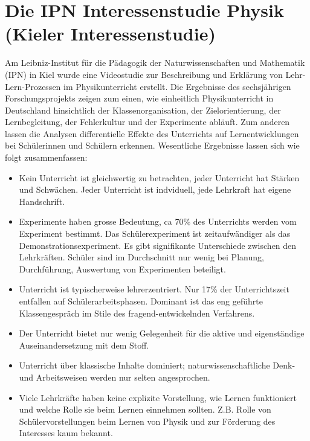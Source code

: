 \section{Die IPN Interessenstudie Physik ({\glqq}Kieler{\grqq} Interessenstudie)}
Am Leibniz-Institut f{\"u}r die P{\"a}dagogik der Naturwissenschaften und Mathematik (IPN) in Kiel wurde eine Videostudie zur Beschreibung und Erkl{\"a}rung von Lehr-Lern-Prozessen im Physikunterricht erstellt. Die Ergebnisse des sechsj{\"a}hrigen Forschungsprojekts zeigen zum einen, wie einheitlich Physikunterricht in Deutschland hinsichtlich der Klassenorganisation, der Zielorientierung, der Lernbegleitung, der Fehlerkultur und der Experimente abl{\"a}uft. Zum anderen lassen die Analysen differentielle Effekte des Unterrichts auf Lernentwicklungen bei Sch{\"u}lerinnen und Sch{\"u}lern erkennen.
\mip
Wesentliche Ergebnisse lassen sich wie folgt zusammenfassen:
\begin{itemize}
\item
Kein Unterricht ist gleichwertig zu betrachten, jeder Unterricht hat St{\"a}rken und Schw{\"a}chen. Jeder Unterricht ist indviduell, jede Lehrkraft hat eigene {\glqq}Handschrift{\grqq}.
\item
 Experimente haben grosse Bedeutung, ca 70\% des Unterrichts werden vom Experiment bestimmt. Das Sch{\"u}lerexperiment ist zeitaufw{\"a}ndiger als das Demonstrationsexperiment. Es gibt signifikante Unterschiede zwischen den Lehrkr{\"a}ften. Sch{\"u}ler sind im Durchschnitt nur wenig bei Planung, Durchf{\"u}hrung, Auswertung von Experimenten beteiligt.
 \item
Unterricht ist typischerweise lehrerzentriert. Nur 17\% der Unterrichtszeit entfallen auf Sch{\"u}lerarbeitsphasen. Dominant ist das eng gef{\"u}hrte Klassengespr{\"a}ch im Stile des fragend-entwickelnden Verfahrens.
\item
Der Unterricht bietet nur wenig Gelegenheit f{\"u}r die aktive und eigenst{\"a}ndige Auseinandersetzung mit dem Stoff.
\item
Unterricht {\"u}ber {\glqq}klassische{\grqq} Inhalte dominiert; naturwissenschaftliche Denk- und Arbeitsweisen werden nur selten angesprochen.
\item
Viele Lehrkr{\"a}fte haben keine explizite Vorstellung,  wie Lernen funktioniert und welche Rolle sie beim Lernen einnehmen sollten. Z.B. Rolle von Sch{\"u}lervorstellungen beim Lernen von Physik und zur F{\"o}rderung des Interesses kaum bekannt.
\end{itemize}



